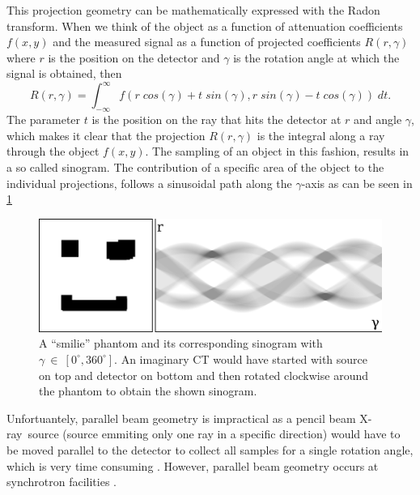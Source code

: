 \documentclass[10pt,journal,compsoc]{IEEEtran}
\newcommand{\xray}{X-ray~}
\begin{document}
This projection geometry can be mathematically expressed with the Radon transform.
When we think of the object as a function of attenuation coefficients $f(x,y)$ and the measured signal as a function of projected coefficients $R(r,\gamma)$ where $r$ is the position on the detector and $\gamma$ is the rotation angle at which the signal is obtained, then
\begin{equation}
\label{eq:radon}
R(r,\gamma) = \int_{-\infty}^{\infty} f(r\;cos(\gamma) + t\;sin(\gamma), r\;sin(\gamma)-t\;cos(\gamma))\;dt.
\end{equation} 
The parameter $t$ is the position on the ray that hits the detector at $r$ and angle $\gamma$, which makes it clear that the projection $R(r,\gamma)$ is the integral along a ray through the object $f(x,y)$.
The sampling of an object in this fashion, results in a so called sinogram.
The contribution of a specific area of the object to the individual projections, follows a sinusoidal path along the $\gamma$-axis as can be seen in \cref{fig:sinogram_parallel}
%
\begin{figure}[!h]
\centering
\includegraphics[width=\linewidth]{img/phantomandradon.png}
\caption{
A \enquote{smilie} phantom and its corresponding sinogram with $\gamma~\in~[0^\circ,360^\circ]$.
An imaginary CT would have started with source on top and detector on bottom and then rotated clockwise around the phantom to obtain the shown sinogram.
}
\label{fig:sinogram_parallel}
\end{figure}
%

Unfortuantely, parallel beam geometry is impractical as a pencil beam \xray source (source emmiting only one ray in a specific direction) would have to be moved parallel to the detector to collect all samples for a single rotation angle, which is very time consuming \cite{Buzug2008_chap7}.
However, parallel beam geometry occurs at synchrotron facilities \cite{something}.
\end{document}

